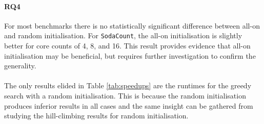 \paragraph{RQ4}
For most benchmarks there is no statistically significant difference between
all-on and random initialisation.  For \verb|SodaCount|, the all-on
initialisation is slightly better for core counts of 4, 8, and 16.  This result
provides evidence that all-on initialisation may be beneficial, but requires
further investigation to confirm the generality.

\paragraph{}

The only results elided in Table \ref{tab:speedups} are the runtimes for the
greedy search with a random initialisation. This is because the random
initialisation produces inferior results in all cases and the same insight can
be gathered from studying the hill-climbing results for random initialisation.
